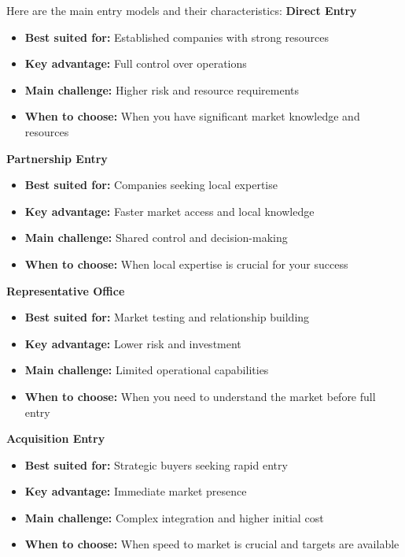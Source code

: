 Here are the main entry models and their characteristics:
\vspace{1em}
\textbf{Direct Entry}
\begin{itemize}
    \item \textbf{Best suited for:} Established companies with strong resources
    \item \textbf{Key advantage:} Full control over operations
    \item \textbf{Main challenge:} Higher risk and resource requirements
    \item \textbf{When to choose:} When you have significant market knowledge and resources
\end{itemize}
\vspace{1em}
\textbf{Partnership Entry}
\begin{itemize}
    \item \textbf{Best suited for:} Companies seeking local expertise
    \item \textbf{Key advantage:} Faster market access and local knowledge
    \item \textbf{Main challenge:} Shared control and decision-making
    \item \textbf{When to choose:} When local expertise is crucial for your success
\end{itemize}
\vspace{1em}
\textbf{Representative Office}
\begin{itemize}
    \item \textbf{Best suited for:} Market testing and relationship building
    \item \textbf{Key advantage:} Lower risk and investment
    \item \textbf{Main challenge:} Limited operational capabilities
    \item \textbf{When to choose:} When you need to understand the market before full entry
\end{itemize}
\vspace{1em}
\textbf{Acquisition Entry}
\begin{itemize}
    \item \textbf{Best suited for:} Strategic buyers seeking rapid entry
    \item \textbf{Key advantage:} Immediate market presence
    \item \textbf{Main challenge:} Complex integration and higher initial cost
    \item \textbf{When to choose:} When speed to market is crucial and targets are available
\end{itemize}


